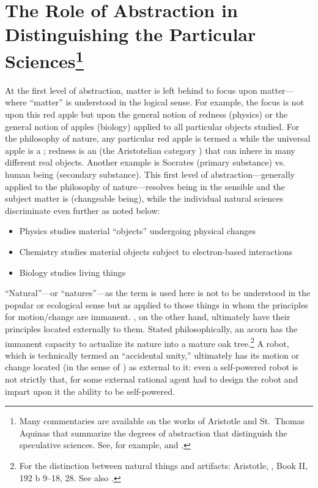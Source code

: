 \section[The Role of Abstraction in Distinguishing the Particular Sciences]{The Role of Abstraction in Distinguishing the Particular Sciences\footnote{Many commentaries are available on the works of Aristotle and St.\ Thomas Aquinas that summarize the degrees of abstraction that distinguish the speculative sciences. See, for example, \citet[][pp.~35--36]{maritain1959} and \citet[][pp.~51--53]{velde2006}.}}

At the first level of abstraction,  matter is left behind to focus upon  matter---where ``matter'' is understood in the logical sense. For example, the focus is not upon this red apple but upon the general notion of redness (physics) or the general notion of apples (biology)  applied to all particular objects studied. For the philosophy of nature, any particular red apple is termed a  while the universal apple is a ; redness is an  (the Aristotelian category ) that can inhere in many different real objects. Another example is Socrates (primary substance) vs. human being (secondary substance). This first level of abstraction---generally applied to the philosophy of nature---resolves being in the sensible and the subject matter is  (changeable being), while the individual natural sciences discriminate even further as noted below:

\begin{itemize}
\item Physics studies  material ``objects'' undergoing physical changes
\item Chemistry studies  material objects subject to electron-based interactions
\item Biology studies  living things
\end{itemize}

``Natural''---or ``natures''---as the term is used here is not to be understood in the popular or ecological sense but as applied to those things in whom the principles for motion/change are immanent. , on the other hand, ultimately have their principles located externally to them. Stated philosophically, an acorn has the immanent capacity to actualize its nature into a mature oak tree.\footnote{For the distinction between natural things and artifacts: Aristotle, , Book II, 192 b 9--18, 28. See also \citet{stump2006}.} A robot, which is technically termed an ``accidental unity,'' ultimately has its motion or change located (in the sense of ) as external to it: even a self-powered robot is not strictly that, for some external rational agent had to design the robot and impart upon it the ability to be self-powered.


